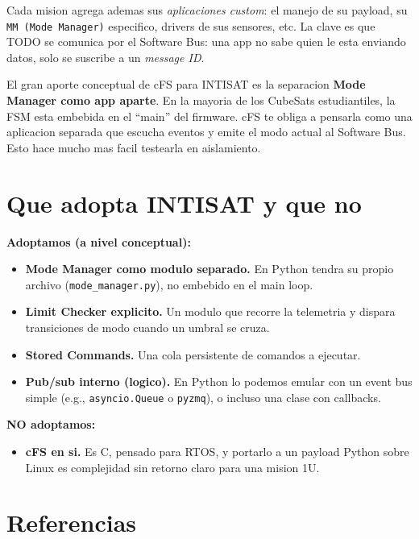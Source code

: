 \documentclass[11pt,a4paper,oneside,openright]{book}
\begin{document}
Cada mision agrega ademas sus \emph{aplicaciones custom}: el manejo
de su payload, su \texttt{MM (Mode Manager)} especifico, drivers de
sus sensores, etc. La clave es que TODO se comunica por el Software
Bus: una app no sabe quien le esta enviando datos, solo se suscribe a
un \emph{message ID}.

\begin{intui}
El gran aporte conceptual de cFS para INTISAT es la separacion
\textbf{Mode Manager como app aparte}. En la mayoria de los CubeSats
estudiantiles, la FSM esta embebida en el ``main'' del firmware. cFS
te obliga a pensarla como una aplicacion separada que escucha eventos
y emite el modo actual al Software Bus. Esto hace mucho mas facil
testearla en aislamiento.
\end{intui}

\section{Que adopta INTISAT y que no}

\begin{logrado}
\textbf{Adoptamos (a nivel conceptual):}
\begin{itemize}[leftmargin=2em]
  \item \textbf{Mode Manager como modulo separado.} En Python tendra
    su propio archivo (\texttt{mode\_manager.py}), no embebido en
    el main loop.
  \item \textbf{Limit Checker explicito.} Un modulo que recorre la
    telemetria y dispara transiciones de modo cuando un umbral se
    cruza.
  \item \textbf{Stored Commands.} Una cola persistente de comandos
    a ejecutar.
  \item \textbf{Pub/sub interno (logico).} En Python lo podemos
    emular con un event bus simple (e.g., \texttt{asyncio.Queue} o
    \texttt{pyzmq}), o incluso una clase con callbacks.
\end{itemize}

\textbf{NO adoptamos:}
\begin{itemize}[leftmargin=2em]
  \item \textbf{cFS en si.} Es C, pensado para RTOS, y portarlo a un
    payload Python sobre Linux es complejidad sin retorno claro
    para una mision 1U.
\end{itemize}
\end{logrado}

\section{Referencias}
\end{document}
